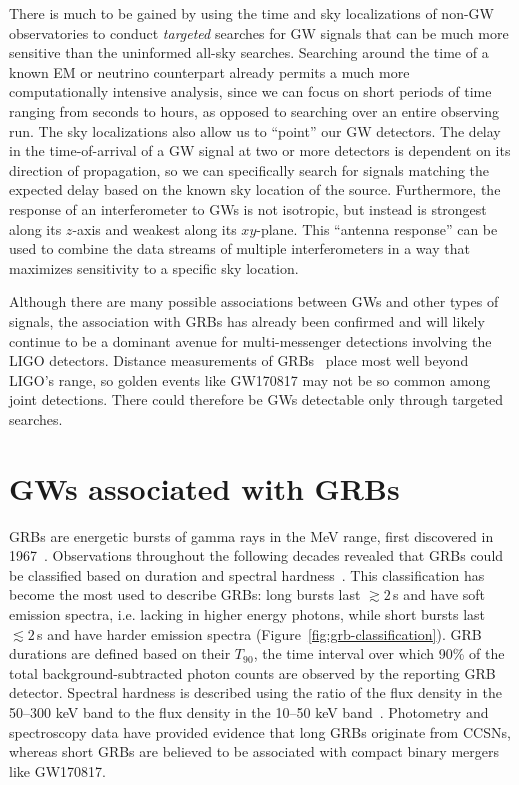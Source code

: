 There is much to be gained by using the time and sky localizations of non-GW observatories to conduct \textit{targeted} searches for GW signals that can be much more sensitive than the uninformed all-sky searches.
Searching around the time of a known EM or neutrino counterpart already permits a much more computationally intensive analysis, since we can focus on short periods of time ranging from seconds to hours, as opposed to searching over an entire observing run.
The sky localizations also allow us to ``point'' our GW detectors.
The delay in the time-of-arrival of a GW signal at two or more detectors is dependent on its direction of propagation, so we can specifically search for signals matching the expected delay based on the known sky location of the source.
Furthermore, the response of an interferometer to GWs is not isotropic, but instead is strongest along its $z$-axis and weakest along its $xy$-plane.
This ``antenna response'' can be used to combine the data streams of multiple interferometers in a way that maximizes sensitivity to a specific sky location.

Although there are many possible associations between GWs and other types of signals, the association with \acp{GRB} has already been confirmed and will likely continue to be a dominant avenue for multi-messenger detections involving the LIGO detectors.
Distance measurements of GRBs~\citep{swift_archive} place most well beyond LIGO's range, so golden events like GW170817 may not be so common among joint detections.
There could therefore be GWs detectable only through targeted searches.


\section{GWs associated with GRBs}\label{sec:gw-grb}

\Acp{GRB} are energetic bursts of gamma rays in the MeV range, first discovered in 1967~\citep{Klebesadel_1973}.
Observations throughout the following decades revealed that \acp{GRB} could be classified based on duration and spectral hardness~\citep{Kouveliotou_1993}.
This classification has become the most used to describe \acp{GRB}: long bursts last $\gtrsim2$\,s and have soft emission spectra, i.e. lacking in higher energy photons, while short bursts last $\lesssim2$\,s and have harder emission spectra (Figure~\ref{fig:grb-classification}).
GRB durations are defined based on their $T_{90}$, the time interval over which 90\% of the total background-subtracted photon counts are observed by the reporting GRB detector.
Spectral hardness is described using the ratio of the flux density in the 50–300 keV band to the flux density in the 10–50 keV band~\citep{fermi_2020}.
Photometry and spectroscopy data have provided evidence that long \acp{GRB} originate from \acp{CCSN}, whereas short \acp{GRB} are believed to be associated with compact binary mergers like GW170817.

